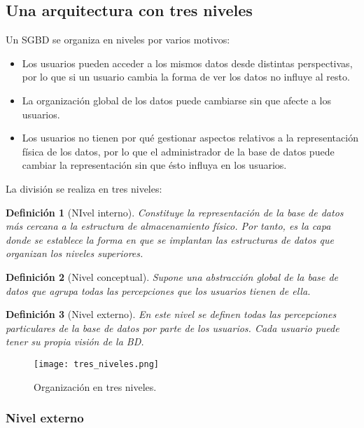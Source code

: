 \documentclass[12pt,spanish]{article}
\newtheorem{definition}{Definición}
\numberwithin{definition}{subsection}
\begin{document}
\subsection{Una arquitectura con tres niveles}
Un SGBD se organiza en niveles por varios motivos:
\begin{itemize}
	\item Los usuarios pueden acceder a los mismos datos desde distintas perspectivas, por lo que si un usuario cambia la forma de ver los datos no influye al resto.
	\item La organización global de los datos puede cambiarse sin que afecte a los usuarios.
	\item Los usuarios no tienen por qué gestionar aspectos relativos a la representación física de los datos, por lo que el administrador de la base de datos puede cambiar la representación sin que ésto influya en los usuarios.
\end{itemize}

La división se realiza en tres niveles:

\begin{definition}[NIvel interno]
Constituye la representación de la base de datos más cercana a la estructura de almacenamiento físico. Por tanto, es la capa donde se establece la forma en que se implantan las estructuras de datos que organizan los niveles superiores.
\end{definition}

\begin{definition}[Nivel conceptual]
Supone una abstracción global de la base de datos que agrupa todas las percepciones que los usuarios tienen de ella.
\end{definition}

\begin{definition}[Nivel externo]
En este nivel se definen todas las percepciones particulares de la base de datos por parte de los usuarios. Cada usuario puede tener su propia visión de la BD.
\end{definition}

\begin{figure}[H]
\centering
\texttt{[image: tres\_niveles.png]}
\caption{Organización en tres niveles.}
\end{figure}

\subsubsection{Nivel externo}
\end{document}
